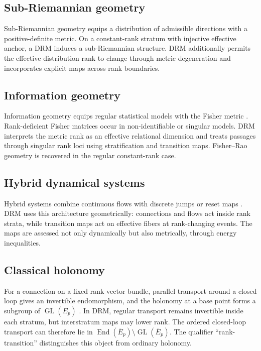 \documentclass[11pt]{article}
\newcommand{\End}{\operatorname{End}}
\newcommand{\GL}{\operatorname{GL}}
\begin{document}
\subsection{Sub-Riemannian geometry}

Sub-Riemannian geometry equips a distribution of admissible directions with a
positive-definite metric. On a constant-rank stratum with injective effective
anchor, a DRM induces a sub-Riemannian structure. DRM additionally permits the
effective distribution rank to change through metric degeneration and
incorporates explicit maps across rank boundaries.

\subsection{Information geometry}

Information geometry equips regular statistical models with the Fisher metric
\cite{AmariNagaoka2000,Nielsen2020}. Rank-deficient Fisher matrices occur in
non-identifiable or singular models. DRM interprets the metric rank as an
effective relational dimension and treats passages through singular rank loci
using stratification and transition maps. Fisher--Rao geometry is recovered in
the regular constant-rank case.

\subsection{Hybrid dynamical systems}

Hybrid systems combine continuous flows with discrete jumps or reset maps
\cite{GoebelSanfeliceTeel2012}. DRM uses this architecture geometrically:
connections and flows act inside rank strata, while transition maps act on
effective fibers at rank-changing events. The maps are assessed not only
dynamically but also metrically, through energy inequalities.

\subsection{Classical holonomy}

For a connection on a fixed-rank vector bundle, parallel transport around a
closed loop gives an invertible endomorphism, and the holonomy at a base point
forms a subgroup of $\GL(E_p)$ \cite{KobayashiNomizu1963,Lee2018}. In DRM,
regular transport remains invertible inside each stratum, but interstratum
maps may lower rank. The ordered closed-loop transport can therefore lie in
$\End(\overline E_p)\setminus\GL(\overline E_p)$. The qualifier
``rank-transition'' distinguishes this object from ordinary holonomy.
\end{document}
